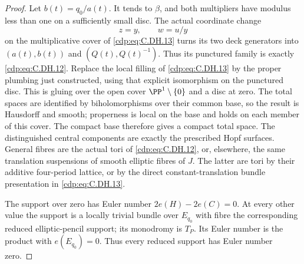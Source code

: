 \begin{proof}
Let $b(t)=q_0/a(t)$.
It tends to $\beta$,
and both multipliers
have modulus less than
one on a sufficiently
small disc. The actual
coordinate change
\[
                        z=y,\qquad w=u/y
                                                               \tag{C.DH.15}\label{cdp:eq:C.DH.15}
\]
on the multiplicative
cover of \eqref{cdp:eq:C.DH.13}
turns its two deck
generators into
$(a(t),b(t))$ and
$(Q(t),Q(t)^{-1})$.
Thus its punctured
family is exactly
\eqref{cdp:eq:C.DH.12}. Replace
the local filling
of \eqref{cdp:eq:C.DH.13} by
the proper plumbing
just constructed,
using that explicit
isomorphism on the
punctured disc.
This is gluing over
the open cover
$\PP^1\setminus\{0\}$
and a disc at zero.
The total spaces
are identified by
biholomorphisms over
their common base,
so the result is
Hausdorff and smooth;
properness is local
on the base and
holds on each member
of this cover.
The compact base
therefore gives a
compact total space.
The distinguished
central components
are exactly the
prescribed Hopf
surfaces. General
fibres are the
actual tori of
\eqref{cdp:eq:C.DH.12}, or,
elsewhere, the same
translation suspensions
of smooth elliptic
fibres of $J$.
The latter are tori
by their additive
four-period lattice,
or by the direct
constant-translation
bundle presentation
in \eqref{cdp:eq:C.DH.13}.

The support over zero
has Euler number
$2e(H)-2e(C)=0$.
At every other value
the support is a
locally trivial bundle
over $E_{q_0}$ with
fibre the corresponding
reduced elliptic-pencil
support; its monodromy
is $T_P$. Its Euler
number is the product
with $e(E_{q_0})=0$.
Thus every reduced
support has Euler
number zero.


\end{proof}
